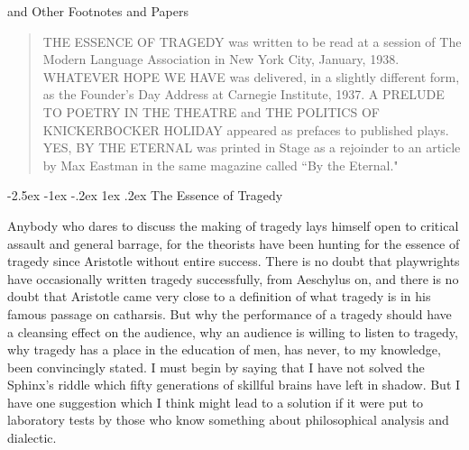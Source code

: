 \documentclass[9pt,twoside]{extarticle}
\title{\essaytitle}
\author{\essayauthor}
\makeatletter
\newcommand{\essaysubtitle}{and Other Footnotes and Papers}
\let\thetitle\@title
\let\theauthor\@author
\renewcommand\section{\@startsection{section}{1}{\z@}%
  {-2.5ex \@plus -1ex \@minus -.2ex}%
  {1ex \@plus .2ex}%
  {\itshape\normalsize}}
\renewcommand{\maketitle}{
  \thispagestyle{empty}
  \begin{center}
    {\fontseries{bx}\Large\MakeTextUppercase\thetitle\par}
    {\fontseries{bx}\large\essaysubtitle\par}
    {\footnotesize{\MakeTextUppercase{\theauthor}}}
  \end{center}
}
\makeatother
\begin{document}
\maketitle

\vspace{2em}


\vspace*{\fill}
\begin{quote}
THE ESSENCE OF TRAGEDY was written to be read at a session of The Modern Language Association in New York City, January, 1938. WHATEVER HOPE WE HAVE was delivered, in a slightly different form, as the Founder's Day Address at Carnegie Institute, 1937. A PRELUDE TO POETRY IN THE THEATRE and THE POLITICS OF KNICKERBOCKER HOLIDAY appeared as prefaces to published plays. YES, BY THE ETERNAL was printed in Stage as a rejoinder to an article by Max Eastman in the same magazine called ``By the Eternal."
\end{quote}
\vspace*{\fill}

\vspace{3em}
\tableofcontents

\vspace*{\fill}

\newpage


\section{The Essence of Tragedy}

Anybody who dares to discuss the making of tragedy lays himself open to critical assault and general barrage, for the theorists have been hunting for the essence of tragedy since Aristotle without entire success. There is no doubt that playwrights have occasionally written tragedy successfully, from Aeschylus on, and there is no doubt that Aristotle came very close to a definition of what tragedy is in his famous passage on catharsis. But why the performance of a tragedy should have a cleansing effect on the audience, why an audience is willing to listen to tragedy, why tragedy has a place in the education of men, has never, to my knowledge, been convincingly stated. I must begin by saying that I have not solved the Sphinx's riddle which fifty generations of skillful brains have left in shadow. But I have one suggestion which I think might lead to a solution if it were put to laboratory tests by those who know something about philosophical analysis and dialectic.
\end{document}
